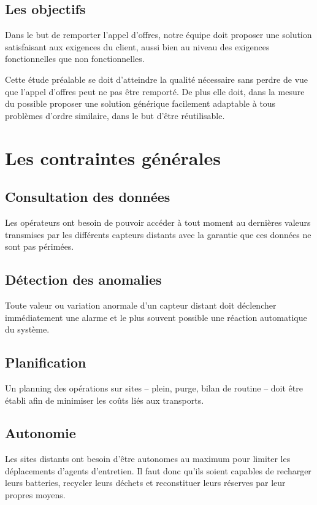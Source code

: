 \documentclass[a4paper, 11pt, draft]{report}
\begin{document}
    \subsection{Les objectifs}

    Dans le but de remporter l'appel d'offres, notre équipe doit proposer une solution satisfaisant aux exigences du client, aussi bien au niveau des exigences fonctionnelles que non fonctionnelles.

    Cette étude préalable se doit d'atteindre la qualité nécessaire sans perdre de vue que l'appel d'offres peut ne pas être remporté. De plus elle doit, dans la mesure du possible proposer une solution générique facilement adaptable à tous problèmes d'ordre similaire, dans le but d'être réutilisable.

\section{Les contraintes générales}
    \subsection{Consultation des données} %
        Les opérateurs ont besoin de pouvoir accéder à tout moment au dernières valeurs transmises par les différents capteurs distants avec la garantie que ces données ne sont pas périmées.

    \subsection{Détection des anomalies} %
        Toute valeur ou variation anormale d'un capteur distant doit déclencher immédiatement une alarme et le plus souvent possible une réaction automatique du système.

    \subsection{Planification} %
         Un planning des opérations sur sites -- plein, purge, bilan de routine --
doit être établi afin de minimiser les coûts liés aux transports.

    \subsection{Autonomie} %
        Les sites distants ont besoin d'être autonomes au maximum pour limiter les déplacements d'agents d'entretien. Il faut donc qu'ils soient capables de recharger leurs batteries, recycler leurs déchets et reconstituer leurs réserves par leur propres moyens.
\end{document}
